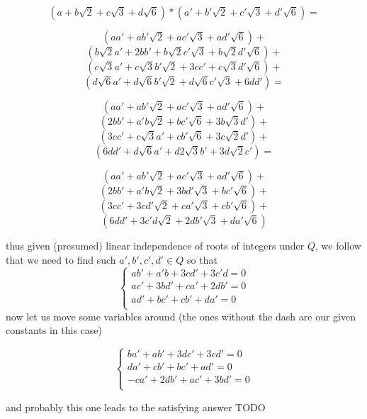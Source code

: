 \documentclass[11pt,oneside,titlepage]{book}
\begin{document}
$$(a + b\sqrt{2} + c\sqrt{3} + d\sqrt{6}) * (a' + b'\sqrt{2} + c'\sqrt{3} + d'\sqrt{6}) = $$

$$ (a a' + a b'\sqrt{2} + a c'\sqrt{3} + a d'\sqrt{6}) + $$
$$ (b \sqrt{2} a' + 2 b b' + b \sqrt{2} c'\sqrt{3} + b \sqrt{2} d'\sqrt{6}) + $$
$$ ( c\sqrt{3} a' + c\sqrt{3} b'\sqrt{2}  + 3 c c' + c\sqrt{3} d'\sqrt{6}) + $$
$$ ( d\sqrt{6} a' + d\sqrt{6} b'\sqrt{2}  + d\sqrt{6} c'\sqrt{3}  + 6 d d') = $$

$$ (a a' +     a b'\sqrt{2} +              a c'\sqrt{3} +              a d'\sqrt{6}) + $$
$$ (2 b b' +   a' b \sqrt{2} +             b  c'\sqrt{6} +             3 b  \sqrt{3} d') + $$
$$ (3 c c' +   c\sqrt{3} a' +              cb'\sqrt{6} +               3 c \sqrt{2} d') + $$
$$ (6 d d' +   d\sqrt{6} a' +              d2\sqrt{3} b' +             3 d\sqrt{2} c') = $$

$$ (a a' +     a b'\sqrt{2} +              a c'\sqrt{3} +              a d'\sqrt{6}  ) + $$
$$ (2 b b' +   a' b \sqrt{2} +             3 b d' \sqrt{3}  +           b c'\sqrt{6}  ) + $$
$$ (3 c c' +   3 c d' \sqrt{2} +           c a' \sqrt{3} +              cb'\sqrt{6}   ) + $$
$$ (6 d d' +   3 c'd \sqrt{2} +           2 db'\sqrt{3}  +            da'\sqrt{6} ) $$

thus given (presumed) linear independence of roots of integers under $Q$, we follow that we need
to find such $a', b', c', d' \in Q$ so that
$$
\begin{cases}
  ab' + a'b + 3cd' + 3c'd = 0 \\
  ac' + 3bd' + ca' + 2db' = 0  \\
  ad' + bc' + cb' + da' = 0  \\  
\end{cases}
$$
now let us move some variables around (the ones without the dash are
our given constants in this case)

$$
\begin{cases}
  b a' + a b' + 3d c' + 3c d' = 0 \\
  da' + cb' + bc' + ad' = 0 \\
  -ca' + 2db' + ac' + 3bd' = 0 \\
\end{cases}
$$

and probably this one leads to the satisfying answer TODO

\subsection{}
\end{document}
